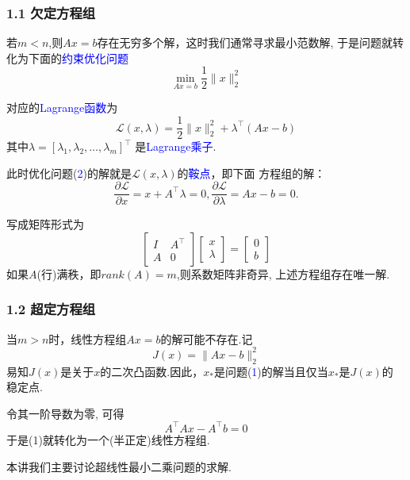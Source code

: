 \documentclass[notheorems,serif]{beamer}
\begin{document}
\begin{frame}
\frametitle{1.1 欠定方程组}
若$m<n$,则$Ax=b$存在无穷多个解，这时我们通常寻求最小范数解, 于是问题就转化为下面的\textcolor{blue}{约束优化问题}
\begin{equation}
\min _{Ax=b} \frac{1}{2}\|x\|_{2}^{2}
\end{equation}

\noindent 对应的\textcolor{blue}{Lagrange函数}为$$\mathcal{L}(x, \lambda)=\frac{1}{2}\|x\|_{2}^{2}+\lambda^{\top}(A x-b)$$
其中$\lambda=\left[\lambda_{1}, \lambda_{2}, \ldots, \lambda_{m}\right]^{\top}$
是\textcolor{blue}{Lagrange乘子}.

此时优化问题(\textcolor{blue}{2})的解就是$\mathcal{L}(x,\lambda)$的\textcolor{blue}{鞍点}，即下面
方程组的解：$$\frac{\partial \mathcal{L}}{\partial x}=x+{A}^{\top}
\lambda=0,\frac{\partial \mathcal{L}}{\partial \lambda}=Ax-b=0.$$
\end{frame}

\begin{frame}
写成矩阵形式为$$
\left[\begin{array}{ll}{I} & {A^{\top}} \\ {A} &{0}\end{array}\right]\left[\begin{array}{l}{x} \\{\lambda}\end{array}\right]=\left[\begin{array}{l}{0} \\{b}\end{array}\right]
$$
如果$A$(行)满秩，即$rank(A)=m$,则系数矩阵非奇异, 上述方程组存在唯一解.
\end{frame}
\begin{frame}
\frametitle{1.2 超定方程组}
当$m>n$时，线性方程组$Ax=b$的解可能不存在.记$$J(x)=\|A x-b\|_{2}^{2}$$
易知$J(x)$是关于$x$的二次凸函数.因此，$x_*$是问题(\textcolor{blue}{1})的解当且仅当$x_*$是$J(x)$的
稳定点.

令其一阶导数为零, 可得$$A^{\top} A x-A^{\top} b=0$$
于是(1)就转化为一个(半正定)线性方程组.

本讲我们主要讨论超线性最小二乘问题的求解.
\end{frame}
\end{document}

